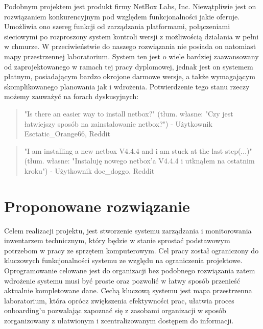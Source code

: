 Podobnym projektem jest produkt firmy NetBox Labs, Inc. Niewątpliwie jest on rozwiązaniem konkurencyjnym pod względem funkcjonalności jakie oferuje. Umożliwia ono szereg funkcji od zarządzania \gls{platforma}mi, połączeniami sieciowymi po rozproszony system kontroli wersji z możliwością działania w pełni w chmurze. W przeciwieństwie do naszego rozwiązania nie posiada on natomiast mapy przestrzennej \gls{laboratorium}. System ten jest o wiele bardziej zaawansowany od zaprojektowanego w ramach tej pracy dyplomowej, jednak jest on systemem płatnym, posiadającym bardzo okrojone darmowe wersje, a także wymagającym skomplikowanego planowania jak i wdrożenia. 
Potwierdzenie tego stanu rzeczy możemy zauważyć na forach dyskusyjnych:
\begin{quote}
    \item "Is there an easier way to install netbox?" (tłum. własne: "Czy jest łatwiejszy sposób na zainstalowanie netbox?") - Użytkownik Esctatic\_Orange66, Reddit \cite{netbox_newbie}
\end{quote}
\begin{quote}
    \item "I am installing a new netbox V4.4.4 and i am stuck at the last step(...)" (tłum. własne: "Instaluję nowego netbox'a V4.4.4 i utknąłem na ostatnim kroku") - Użytkownik doc\_doggo, Reddit \cite{netbox_stuck}
\end{quote}

\section{Proponowane rozwiązanie}
\par Celem realizacji projektu, jest stworzenie systemu zarządzania i monitorowania inwentarzem technicznym, który będzie w stanie sprostać podstawowym potrzebom w pracy ze sprzętem komputerowym. Cel pracy został ograniczony do kluczowych funkcjonalności systemu ze względu na ograniczenia projektowe. Oprogramowanie celowane jest do organizacji bez podobnego rozwiązania zatem wdrożenie systemu musi być proste oraz pozwolić w łatwy sposób przenieść aktualnie kompletowane dane. Cechą kluczową systemu jest mapa przestrzenna \gls{laboratorium}, która oprócz zwiększenia efektywności prac, ułatwia proces \gls{onboarding}'u pozwalając zapoznać się z zasobami organizacji w sposób zorganizowany z ułatwionym i zcentralizowanym dostępem do informacji.